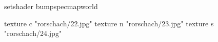 setshader bumpspecmapworld

    texture c "rorschach/22.jpg"
    texture n "rorschach/23.jpg"
    texture s "rorschach/24.jpg"
